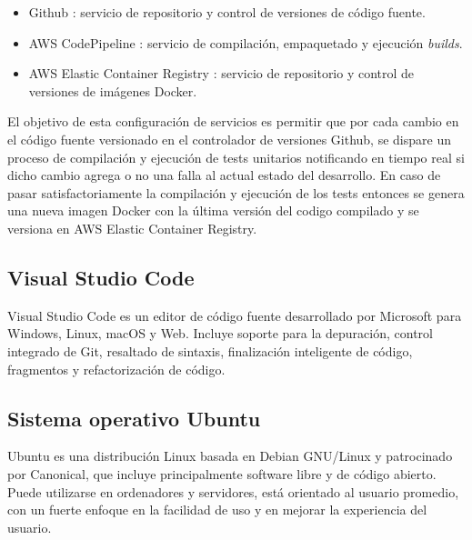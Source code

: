\begin{itemize}
	\item Github \cite{SoftwareTool_Github}: servicio de repositorio y control de versiones de código fuente.
	\item AWS CodePipeline \cite{AWS_codePipeline}: servicio de compilación, empaquetado y ejecución \textit{builds}.
	\item AWS Elastic Container Registry \cite{aws_ECR}: servicio de repositorio y control de versiones de imágenes Docker.
\end{itemize}

El objetivo de esta configuración de servicios es permitir que por cada cambio en el código fuente versionado en el controlador de versiones Github, se dispare un proceso de compilación y ejecución de tests unitarios notificando en tiempo real si dicho cambio agrega o no una falla al actual estado del desarrollo. En caso de pasar satisfactoriamente la compilación y ejecución de los tests entonces se genera una nueva imagen Docker con la última versión del codigo compilado y se versiona en AWS Elastic Container Registry.

\subsection{Visual Studio Code}

Visual Studio Code \cite{vscode_website} es un editor de código fuente desarrollado por Microsoft para Windows, Linux, macOS y Web. Incluye soporte para la depuración, control integrado de Git, resaltado de sintaxis, finalización inteligente de código, fragmentos y refactorización de código.


\subsection{Sistema operativo Ubuntu}
Ubuntu \cite{ubuntu_website} es una distribución Linux basada en Debian GNU/Linux y patrocinado por Canonical, que incluye principalmente software libre y de código abierto. Puede utilizarse en ordenadores y servidores, está orientado al usuario promedio, con un fuerte enfoque en la facilidad de uso y en mejorar la experiencia del usuario.




